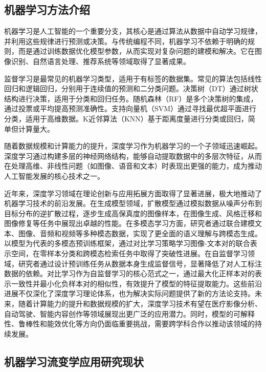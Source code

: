 \subsection{机器学习方法介绍}
机器学习是人工智能的一个重要分支，其核心是通过算法从数据中自动学习规律，并利用这些规律进行预测或决策。与传统编程不同，机器学习不依赖于明确的规则，而是通过训练数据优化模型参数，从而实现对复杂问题的建模和解决。它在图像识别、自然语言处理、推荐系统等领域取得了显著成果\cite{wang2023scientific}。

监督学习是最常见的机器学习类型，适用于有标签的数据集。常见的算法包括线性回归和逻辑回归，分别用于连续值的预测和二分类问题\cite{uesaka1973theory,liu2021self}。决策树（DT）通过树状结构进行决策，适用于分类和回归任务\cite{quinlan1986induction}。随机森林（RF）是多个决策树的集成，通过投票或平均提高预测准确性\cite{breiman2001random}。支持向量机（SVM）通过寻找最优超平面进行分类，适用于高维数据\cite{cortes1995support}。K近邻算法（KNN）基于距离度量进行分类或回归，简单但计算量大\cite{cover1967nearest}。

随着数据规模和计算能力的提升，深度学习作为机器学习的一个子领域迅速崛起。深度学习通过构建多层的神经网络结构，能够自动提取数据中的多层次特征，从而在处理高维、非线性问题（如图像、语音和文本）时表现出更强的能力，成为推动人工智能发展的核心技术之一\cite{wang2023scientific}。

近年来，深度学习领域在理论创新与应用拓展方面取得了显著进展，极大地推动了机器学习技术的前沿发展。在生成模型领域，扩散模型通过模拟数据从噪声分布到目标分布的逆扩散过程，逐步生成高保真度的图像样本，在图像生成、风格迁移和图像修复等任务中展现出卓越的性能\cite{yang2023diffusion}。在多模态学习方面，研究者通过联合建模文本、图像、音频和视频等多种模态数据，实现了更全面的语义理解与跨模态生成。以模型为代表的多模态预训练框架，通过对比学习策略学习图像-文本对的联合表示空间，在零样本分类和跨模态检索任务中取得了突破性进展\cite{xu2023multimodal}。在自监督学习领域，研究者通过设计预训练任务从数据本身生成监督信号，显著降低了对人工标注数据的依赖\cite{Xie2023}。对比学习作为自监督学习的核心范式之一，通过最大化正样本对的表示一致性并最小化负样本对的相似性，有效提升了模型的特征提取能力\cite{Zhu2024Vision}。这些前沿进展不仅深化了深度学习理论体系，也为解决实际问题提供了新的方法论支持。未来，随着计算能力的提升和数据规模的扩大，深度学习技术有望在医疗影像分析、自动驾驶、智能内容创作等领域展现出更广泛的应用潜力。同时，模型的可解释性、鲁棒性和能效优化等方向仍面临重要挑战，需要跨学科合作以推动该领域的持续发展\cite{wang2023scientific}。

\subsection{机器学习流变学应用研究现状}
